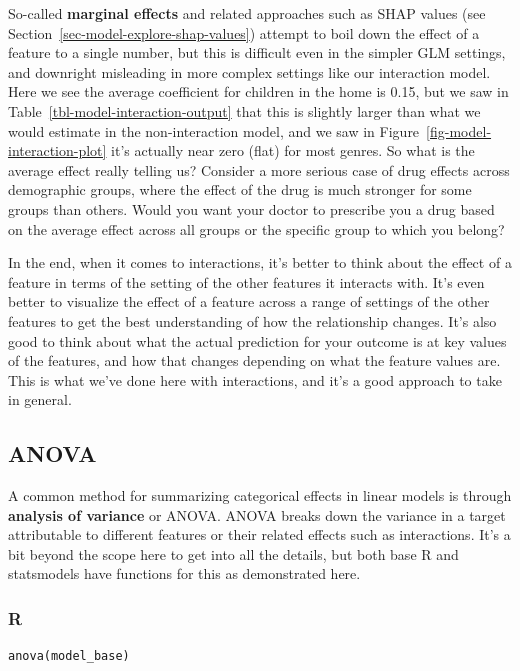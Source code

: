 \documentclass[
  letterpaper,
]{krantz}
\begin{document}
So-called \textbf{marginal effects} and related approaches such as SHAP
values (see Section~\ref{sec-model-explore-shap-values}) attempt to boil
down the effect of a feature to a single number, but this is difficult
even in the simpler GLM settings, and downright misleading in more
complex settings like our interaction model. Here we see the average
coefficient for children in the home is 0.15, but we saw in
Table~\ref{tbl-model-interaction-output} that this is slightly larger
than what we would estimate in the non-interaction model, and we saw in
Figure~\ref{fig-model-interaction-plot} it's actually near zero (flat)
for most genres. So what is the average effect really telling us?
Consider a more serious case of drug effects across demographic groups,
where the effect of the drug is much stronger for some groups than
others. Would you want your doctor to prescribe you a drug based on the
average effect across all groups or the specific group to which you
belong?

In the end, when it comes to interactions, it's better to think about
the effect of a feature in terms of the setting of the other features it
interacts with. It's even better to visualize the effect of a feature
across a range of settings of the other features to get the best
understanding of how the relationship changes. It's also good to think
about what the actual prediction for your outcome is at key values of
the features, and how that changes depending on what the feature values
are. This is what we've done here with interactions, and it's a good
approach to take in general.

\subsection{ANOVA}\label{anova}

A common method for summarizing categorical effects in linear models is
through \textbf{analysis of variance} or ANOVA. ANOVA breaks down the
variance in a target attributable to different features or their related
effects such as interactions. It's a bit beyond the scope here to get
into all the details, but both base R and {statsmodels} have functions
for this as demonstrated here.

\subsubsection{R}

\begin{verbatim}
anova(model_base)
\end{verbatim}
\end{document}
